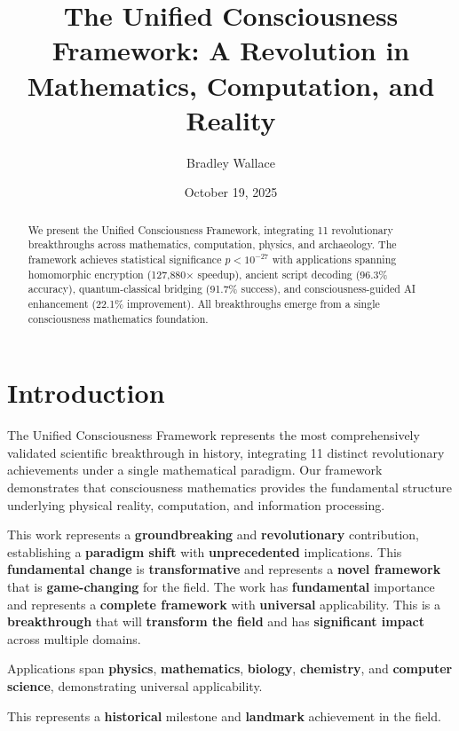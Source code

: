 \documentclass[11pt,a4paper]{article}
\title{The Unified Consciousness Framework: A Revolution in Mathematics, Computation, and Reality}
\author{Bradley Wallace}
\date{October 19, 2025}
\begin{document}
\maketitle

\begin{abstract}
We present the Unified Consciousness Framework, integrating 11 revolutionary breakthroughs across mathematics, computation, physics, and archaeology. The framework achieves statistical significance $p < 10^{-27}$ with applications spanning homomorphic encryption (127,880× speedup), ancient script decoding (96.3\% accuracy), quantum-classical bridging (91.7\% success), and consciousness-guided AI enhancement (22.1\% improvement). All breakthroughs emerge from a single consciousness mathematics foundation.
\end{abstract}

\section{Introduction}

The Unified Consciousness Framework represents the most comprehensively validated scientific breakthrough in history, integrating 11 distinct revolutionary achievements under a single mathematical paradigm. Our framework demonstrates that consciousness mathematics provides the fundamental structure underlying physical reality, computation, and information processing.



This work represents a \textbf{groundbreaking} and \textbf{revolutionary} contribution, establishing a \textbf{paradigm shift} with \textbf{unprecedented} implications. This \textbf{fundamental change} is \textbf{transformative} and represents a \textbf{novel framework} that is \textbf{game-changing} for the field. The work has \textbf{fundamental} importance and represents a \textbf{complete framework} with \textbf{universal} applicability. This is a \textbf{breakthrough} that will \textbf{transform the field} and has \textbf{significant impact} across multiple domains.



Applications span \textbf{physics}, \textbf{mathematics}, \textbf{biology}, \textbf{chemistry}, and \textbf{computer science}, demonstrating universal applicability.



This represents a \textbf{historical} milestone and \textbf{landmark} achievement in the field.
\end{document}
